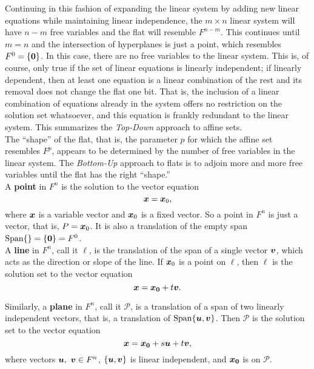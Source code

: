 Continuing in this fashion of expanding the linear system by adding new linear equations while maintaining linear independence, the $m\times n$ linear system will have  $n-m$ free variables and the flat will resemble $F^{n-m}$. This continues until $m=n$ and the intersection of hyperplanes is just a point, which resembles $F^0=\{\boldsymbol 0\}$. In this case, there are no free variables to the linear system. This is, of course, only true if the set of linear equations is linearly independent; if linearly dependent, then at least one equation is a linear combination of the rest and its removal does not change the flat one bit. That is, the inclusion of a linear combination of equations already in the system offers no restriction on the solution set whatsoever, and this equation is frankly redundant to the linear system. This summarizes the \emph{Top-Down} approach to affine sets.\\

The ``shape'' of the flat, that is, the parameter $p$ for which the affine set resembles $F^p$, appears to be determined by the number of free variables in the linear system. The \emph{Bottom-Up} approach to flats is to adjoin more and more free variables until the flat has the right ``shape.''\\

A \textbf{point} in $F^n$ is the solution to the vector equation \[ \boldsymbol x = \boldsymbol x_0,\] where $\boldsymbol x$ is a variable vector and $\boldsymbol x_0$ is a fixed vector. So a point in $F^n$ is just a vector, that is, $P = \boldsymbol x_0$. It is also a translation of the empty span $\operatorname{Span}\{\} = \{\boldsymbol 0\} = F^0$.\\

A \textbf{line} in $F^n$, call it $\ell$,  is the translation of the span of a single vector $\boldsymbol v$, which acts as the direction or slope of the line. If $\boldsymbol x_0$ is a point on $\ell$, then $\ell$ is the solution set to the vector equation
\[ \boldsymbol x = \boldsymbol{x_0} + t\boldsymbol v.\] 

Similarly, a \textbf{plane} in $F^n$, call it $\mathcal{P}$, is a translation of a span of two linearly independent vectors, that is, a translation of $\operatorname{Span}\{\boldsymbol u, \boldsymbol v\}$. Then $\mathcal{P}$ is the solution set to the vector equation
\[ \boldsymbol x = \boldsymbol{x_0} + s\boldsymbol u + t\boldsymbol v,\]
where vectors $\boldsymbol u,\ \boldsymbol v\in F^n$, $\{\boldsymbol u, \boldsymbol v\}$ is linear independent, and $\boldsymbol{x_0}$ is on $\mathcal{P}$.\\

